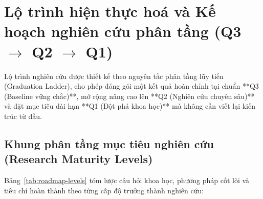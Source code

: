 \section{Lộ trình hiện thực hoá và Kế hoạch nghiên cứu phân tầng \texorpdfstring{(Q3 $\rightarrow$ Q2 $\rightarrow$ Q1)}{(Q3 -> Q2 -> Q1)}}

Lộ trình nghiên cứu được thiết kế theo nguyên tắc phân tầng lũy tiến (Graduation Ladder), cho phép đóng gói một kết quả hoàn chỉnh tại chuẩn **Q3 (Baseline vững chắc)**, mở rộng nâng cao lên **Q2 (Nghiên cứu chuyên sâu)** và đặt mục tiêu dài hạn **Q1 (Đột phá khoa học)** mà không cần viết lại kiến trúc từ đầu.

\subsection{Khung phân tầng mục tiêu nghiên cứu (Research Maturity Levels)}

Bảng~\ref{tab:roadmap-levels} tóm lược câu hỏi khoa học, phương pháp cốt lõi và tiêu chí hoàn thành theo từng cấp độ trưởng thành nghiên cứu:

